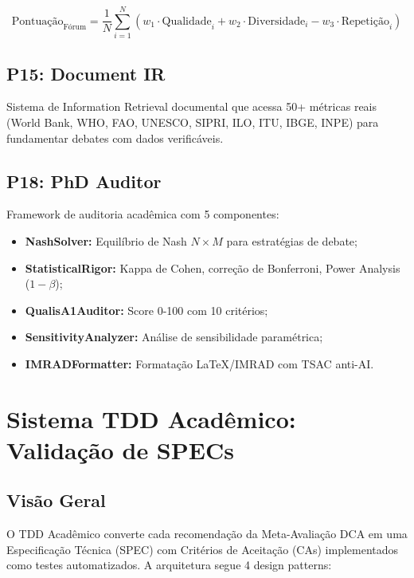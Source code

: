\documentclass[12pt,a4paper,sumario=tradicional]{abntex2}
\begin{document}
\begin{equation}
    \text{Pontuação}_{\text{Fórum}} = \frac{1}{N}\sum_{i=1}^N \left(w_1 \cdot \text{Qualidade}_i + w_2 \cdot \text{Diversidade}_i - w_3 \cdot \text{Repetição}_i\right)
\end{equation}

\section{P15: Document IR}

Sistema de Information Retrieval documental que acessa 50+ métricas reais (World Bank, WHO, FAO, UNESCO, SIPRI, ILO, ITU, IBGE, INPE) para fundamentar debates com dados verificáveis.

\section{P18: PhD Auditor}

Framework de auditoria acadêmica com 5 componentes:
\begin{itemize}
    \item \textbf{NashSolver:} Equilíbrio de Nash $N\times M$ para estratégias de debate;
    \item \textbf{StatisticalRigor:} Kappa de Cohen, correção de Bonferroni, Power Analysis ($1-\beta$);
    \item \textbf{QualisA1Auditor:} Score 0-100 com 10 critérios;
    \item \textbf{SensitivityAnalyzer:} Análise de sensibilidade paramétrica;
    \item \textbf{IMRADFormatter:} Formatação LaTeX/IMRAD com TSAC anti-AI.
\end{itemize}

\chapter{Sistema TDD Acadêmico: Validação de SPECs}

\section{Visão Geral}

O TDD Acadêmico converte cada recomendação da Meta-Avaliação DCA em uma Especificação Técnica (SPEC) com Critérios de Aceitação (CAs) implementados como testes automatizados. A arquitetura segue 4 design patterns:
\end{document}
